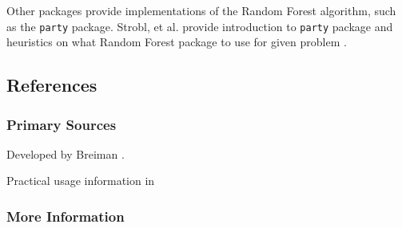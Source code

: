 Other packages provide implementations of the Random Forest algorithm, such as the \texttt{party} package. Strobl, et al. provide introduction to \texttt{party} package and heuristics on what Random Forest package to use for given problem \cite{Strobl2009} .


\subsection{References}

\subsubsection{Primary Sources}

Developed by Breiman \cite{Breiman2001}.

Practical usage information in \cite{Breiman2003}

\subsubsection{More Information}



